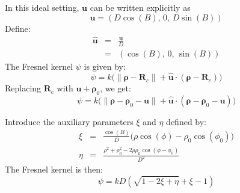 \documentclass{beamer}
\begin{document}
    \begin{frame}
        In this ideal setting, $\mathbf{u}$ can be written explicitly as
        \begin{equation}
            \mathbf{u}=\left(
                D\cos(B),\,0,\,D\sin(B)
            \right)
        \end{equation}
        Define:
        \begin{equation}
            \begin{array}{rcl}
                \displaystyle
                \hat{\mathbf{u}}
                &=&
                \displaystyle
                \frac{\mathbf{u}}{D}\\[1em]
                &=&
                \displaystyle
                \left(
                    \cos(B),\,0,\,\sin(B)
                \right)
            \end{array}
        \end{equation}
        The Fresnel kernel $\psi$ is given by:
        \begin{equation}
            \psi
            =
            k\Big(
                \|\boldsymbol{\rho}-\mathbf{R}_{c}\|
                +\hat{\mathbf{u}}\cdot\left(
                    \boldsymbol{\rho}-\mathbf{R}_{c}
                \right)
            \Big)
        \end{equation}
        Replacing $\mathbf{R}_{c}$ with $\mathbf{u}+\boldsymbol{\rho}_{0}$,
        we get:
        \begin{equation}
            \psi=
            k\Big(
                \|\boldsymbol{\rho}-\boldsymbol{\rho}_{0}-\mathbf{u}\|
                +\hat{\boldsymbol{u}}\cdot\left(
                    \boldsymbol{\rho}-\boldsymbol{\rho}_{0}-\mathbf{u}
                \right)
            \Big)
        \end{equation}
    \end{frame}
    \begin{frame}
        Introduce the auxiliary parameters $\xi$ and $\eta$ defined by:
        \begin{equation}
            \begin{array}{rcl}
                \displaystyle
                \xi
                &=&
                \displaystyle
                \frac{\cos(B)}{D}\Big(
                    \rho\cos(\phi)-\rho_{0}\cos(\phi_{0})
                \Big)\\[1em]
                \displaystyle
                \eta
                &=&
                \displaystyle
                \frac{\rho^{2}+\rho_{0}^{2}-2\rho\rho_{0}\cos(\phi-\phi_{0})}
                    {D^{2}}
            \end{array}
        \end{equation}
        The Fresnel kernel is then:
        \begin{equation}
            \psi
            =kD\left(
                \sqrt{1-2\xi+\eta}
                +\xi-1
            \right)
        \end{equation}
    \end{frame}
\end{document}
